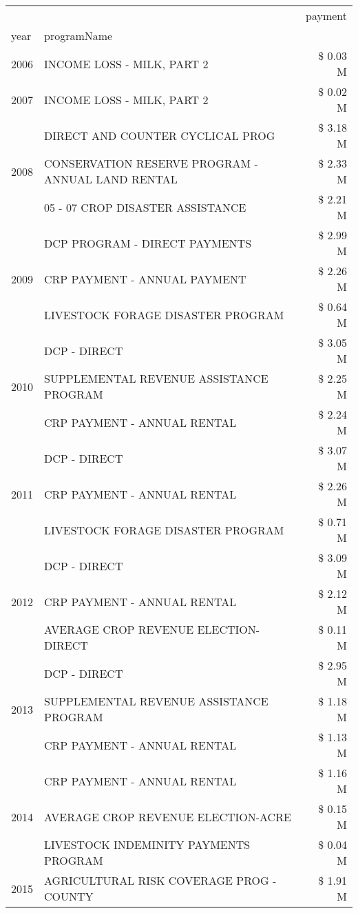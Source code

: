 \begin{tabular}{llr}
\toprule
 &  & payment \\
year & programName &  \\
\midrule
2006 & INCOME LOSS - MILK, PART 2 & \$ 0.03 M \\
\cline{1-3}
2007 & INCOME LOSS - MILK, PART 2 & \$ 0.02 M \\
\cline{1-3}
\multirow[t]{3}{*}{2008} & DIRECT AND COUNTER CYCLICAL PROG & \$ 3.18 M \\
 & CONSERVATION RESERVE PROGRAM - ANNUAL LAND RENTAL & \$ 2.33 M \\
 & 05 - 07 CROP DISASTER ASSISTANCE & \$ 2.21 M \\
\cline{1-3}
\multirow[t]{3}{*}{2009} & DCP PROGRAM - DIRECT PAYMENTS & \$ 2.99 M \\
 & CRP PAYMENT - ANNUAL PAYMENT & \$ 2.26 M \\
 & LIVESTOCK FORAGE DISASTER  PROGRAM & \$ 0.64 M \\
\cline{1-3}
\multirow[t]{3}{*}{2010} & DCP - DIRECT & \$ 3.05 M \\
 & SUPPLEMENTAL REVENUE ASSISTANCE PROGRAM & \$ 2.25 M \\
 & CRP PAYMENT - ANNUAL RENTAL & \$ 2.24 M \\
\cline{1-3}
\multirow[t]{3}{*}{2011} & DCP - DIRECT & \$ 3.07 M \\
 & CRP PAYMENT - ANNUAL RENTAL & \$ 2.26 M \\
 & LIVESTOCK FORAGE DISASTER PROGRAM & \$ 0.71 M \\
\cline{1-3}
\multirow[t]{3}{*}{2012} & DCP - DIRECT & \$ 3.09 M \\
 & CRP PAYMENT - ANNUAL RENTAL & \$ 2.12 M \\
 & AVERAGE CROP REVENUE ELECTION-DIRECT & \$ 0.11 M \\
\cline{1-3}
\multirow[t]{3}{*}{2013} & DCP - DIRECT & \$ 2.95 M \\
 & SUPPLEMENTAL REVENUE ASSISTANCE PROGRAM & \$ 1.18 M \\
 & CRP PAYMENT - ANNUAL RENTAL & \$ 1.13 M \\
\cline{1-3}
\multirow[t]{3}{*}{2014} & CRP PAYMENT - ANNUAL RENTAL & \$ 1.16 M \\
 & AVERAGE CROP REVENUE ELECTION-ACRE & \$ 0.15 M \\
 & LIVESTOCK INDEMINITY PAYMENTS PROGRAM & \$ 0.04 M \\
\cline{1-3}
\multirow[t]{3}{*}{2015} & AGRICULTURAL RISK COVERAGE PROG - COUNTY & \$ 1.91 M \\

\end{tabular}
